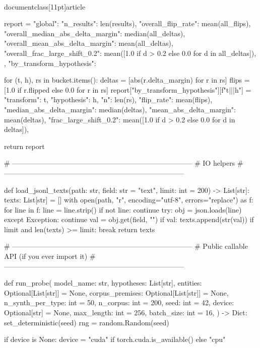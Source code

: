 \\documentclass[11pt]{article}
\begin{document}
\begin{CodeBlock}
    report = {
        "global": {
            "n_results": len(results),
            "overall_flip_rate": mean(all_flips),
            "overall_median_abs_delta_margin": median(all_deltas),
            "overall_mean_abs_delta_margin": mean(all_deltas),
            "overall_frac_large_shift_0.2": mean([1.0 if d > 0.2 else 0.0 for d in all_deltas]),
        },
        "by_transform_hypothesis": {}
    }

    for (t, h), rs in bucket.items():
        deltas = [abs(r.delta_margin) for r in rs]
        flips = [1.0 if r.flipped else 0.0 for r in rs]
        report["by_transform_hypothesis"][f"{t}|||{h}"] = {
            "transform": t,
            "hypothesis": h,
            "n": len(rs),
            "flip_rate": mean(flips),
            "median_abs_delta_margin": median(deltas),
            "mean_abs_delta_margin": mean(deltas),
            "frac_large_shift_0.2": mean([1.0 if d > 0.2 else 0.0 for d in deltas]),
        }

    return report


# -----------------------------------------------------------------------------
# IO helpers
# -----------------------------------------------------------------------------

def load_jsonl_texts(path: str, field: str = "text", limit: int = 200) -> List[str]:
    texts: List[str] = []
    with open(path, "r", encoding="utf-8", errors="replace") as f:
        for line in f:
            line = line.strip()
            if not line:
                continue
            try:
                obj = json.loads(line)
            except Exception:
                continue
            val = obj.get(field, "")
            if val:
                texts.append(str(val))
            if limit and len(texts) >= limit:
                break
    return texts


# -----------------------------------------------------------------------------
# Public callable API (if you ever import it)
# -----------------------------------------------------------------------------

def run_probe(
    model_name: str,
    hypotheses: List[str],
    entities: Optional[List[str]] = None,
    corpus_premises: Optional[List[str]] = None,
    n_synth_per_type: int = 50,
    n_corpus: int = 200,
    seed: int = 42,
    device: Optional[str] = None,
    max_length: int = 256,
    batch_size: int = 16,
) -> Dict:
    set_deterministic(seed)
    rng = random.Random(seed)

    if device is None:
        device = "cuda" if torch.cuda.is_available() else "cpu"


\end{CodeBlock}
\end{document}
